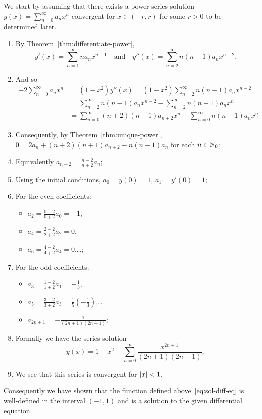 We start by assuming that there exists a power series solution \(y(x) = \sum_{n=0}^{\infty}a_n x^n\) convergent for \(x \in (-r,r)\) for some \(r>0\) to be determined later.
\begin{enumerate}
  \item
        By Theorem~\ref{thm:differentiate-power},
        \[
          y'(x) = \sum_{n=1}^{\infty}n a_n x^{n-1}
          \quad\text{and} \quad
          y''(x) = \sum_{n=2}^{\infty}n(n-1) a_n x^{n-2}.
        \]
  \item And so
        \[
          \begin{aligned}
            -2 \sum_{n=0}^{\infty}a_n x^n
              & = (1-x^2)y''(x)
            = (1-x^2) \sum_{n=2}^{\infty}n(n-1) a_n x^{n-2}                                        \\
              & = \sum_{n=2}^{\infty}n(n-1) a_n x^{n-2} - \sum_{n=2}^{\infty}n(n-1) a_n x^{n}       \\
              & = \sum_{n=0}^{\infty}(n+2)(n+1) a_{n+2} x^{n} - \sum_{n=0}^{\infty}n(n-1) a_n x^{n}
          \end{aligned}
        \]
  \item Consequently, by Theorem~\ref{thm:unique-power}, \(0 = 2a_n +  (n+2)(n+1) a_{n+2} -  n(n-1) a_n \) for each \(n \in \mathbb{N}_0\);
  \item Equivalently \(a_{n+2} = \frac{n-2}{n+2}a_n\);
  \item Using the initial conditions,  \(a_0 = y(0) = 1\), \(a_1 = y'(0) = 1\);
  \item For the even coefficients:
        \begin{itemize}
          \item \(a_2 =  \frac{0-2}{0+2}a_0 = -1\),
          \item \(a_4 =  \frac{2-2}{2+2}a_2 = 0\),
          \item  \(a_6 =  \frac{4-2}{4+2}a_4 = 0\),\ldots;
        \end{itemize}
  \item For the odd coefficients:
        \begin{itemize}
          \item \(a_3 =  \frac{1-2}{1+2}a_1 = -\frac{1}{3}\),
          \item \(a_5= \frac{3-2}{3+2}a_3 = \frac{1}{5}(-\frac{1}{3})\),\ldots
          \item \(a_{2n+1} = -\frac{1}{(2n+1)(2n-1)}\);
        \end{itemize}
  \item Formally we have the series solution
        \begin{equation}
          \label{eq:sol-diff-eq}
          y(x) = 1 - x^2 - \sum_{n=0}^{\infty} \frac{x^{2n+1}}{(2n+1)(2n-1)},
        \end{equation}
  \item We see that this series is convergent for \(\left|x\right|<1\).
\end{enumerate}
%
Consequently we have shown that the function defined above~\eqref{eq:sol-diff-eq} is well-defined in the interval \((-1,1)\) and is a solution to the given differential equation.


